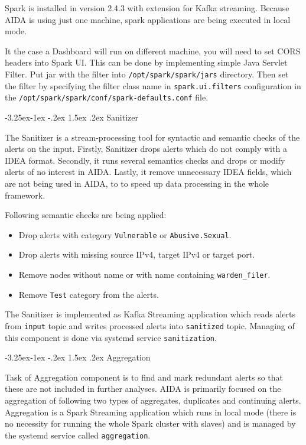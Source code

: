 \documentclass[a4paper]{article} %
\makeatletter
\renewcommand\subsection{\@startsection{subsection}{2}{\z@}%
                   {-3.25ex\@plus -1ex \@minus -.2ex}%
                   {1.5ex \@plus .2ex}%
                   {\normalfont\sffamily\large\bfseries\color{projectcolor}}}
\makeatother
\begin{document}
Spark is installed in version 2.4.3 with extension for Kafka streaming. Because AIDA is using just one machine, spark applications are being executed in local mode.

It the case a Dashboard will run on different machine, you will need to set CORS headers into Spark UI. This can be done by implementing simple Java Servlet Filter. Put jar with the filter into \texttt{/opt/spark/spark/jars} directory. Then set the filter by specifying the filter class name in \texttt{spark.ui.filters} configuration in the \texttt{/opt/spark/spark/conf/spark-defaults.conf} file.

\subsection{Sanitizer}

The Sanitizer is a stream-processing tool for syntactic and semantic checks of the alerts on the input. Firstly, Sanitizer drops alerts which do not comply with a IDEA format. Secondly, it runs several semantics checks and drops or modify alerts of no interest in AIDA. Lastly, it remove unnecessary IDEA fields, which are not being used in AIDA, to to speed up data processing in the whole framework.

Following semantic checks are being applied:
\begin{itemize}[noitemsep,nolistsep]
\item Drop alerts with category \texttt{Vulnerable} or \texttt{Abusive.Sexual}.
\item Drop alerts with missing source IPv4, target IPv4 or target port.
\item Remove nodes without name or with name containing \texttt{warden\_filer}.
\item Remove \texttt{Test} category from the alerts.
\end{itemize}
The Sanitizer is implemented as Kafka Streaming application which reads alerts from \texttt{input} topic and writes processed alerts into \texttt{sanitized} topic. Managing of this component is done via systemd service \texttt{sanitization}.

\subsection{Aggregation}

Task of Aggregation component is to find and mark redundant alerts so that these are not
included in further analyses. AIDA is primarily focused on the aggregation of following two types of aggregates,
duplicates and continuing alerts.
Aggregation is a Spark Streaming application which runs in local mode (there is no necessity for running the whole
Spark cluster with slaves) and is managed by the systemd service called \texttt{aggregation}.
\end{document}
